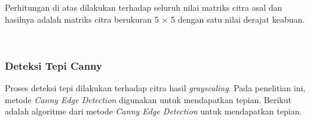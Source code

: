 \noindent Perhitungan di atas dilakukan terhadap seluruh nilai matriks citra asal dan hasilnya adalah matriks citra berukuran 5 $\times$ 5 dengan satu nilai derajat keabuan.

\begin{adjustbox}{width=1\textwidth}
	\noindent\begin{minipage}{\linewidth}
		\label{fig:MatriksCitraGrayscale}
	\end{minipage}
\end{adjustbox} \\

\subsubsection{Deteksi Tepi Canny}
\noindent Proses deteksi tepi dilakukan terhadap citra hasil \textit{grayscaling}. Pada penelitian ini, metode \textit{Canny Edge Detection} digunakan untuk mendapatkan tepian. Berikut adalah algoritme dari metode \textit{Canny Edge Detection} untuk mendapatkan tepian.

